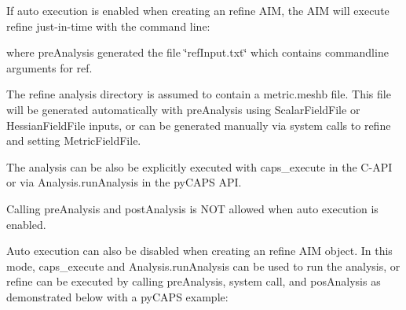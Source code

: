 If auto execution is enabled when creating an refine AIM, the AIM will execute refine just-\/in-\/time with the command line\+:


\begin{DoxyCode}{0}

\end{DoxyCode}


where pre\+Analysis generated the file \char`\"{}ref\+Input.\+txt\char`\"{} which contains commandline arguments for ref.

The refine analysis directory is assumed to contain a metric.\+meshb file. This file will be generated automatically with pre\+Analysis using Scalar\+Field\+File or Hessian\+Field\+File inputs, or can be generated manually via system calls to refine and setting Metric\+Field\+File.

The analysis can be also be explicitly executed with caps\+\_\+execute in the C-\/\+API or via Analysis.\+run\+Analysis in the py\+CAPS API.

Calling pre\+Analysis and post\+Analysis is NOT allowed when auto execution is enabled.

Auto execution can also be disabled when creating an refine AIM object. In this mode, caps\+\_\+execute and Analysis.\+run\+Analysis can be used to run the analysis, or refine can be executed by calling pre\+Analysis, system call, and pos\+Analysis as demonstrated below with a py\+CAPS example\+:


\begin{DoxyCode}{0}
\DoxyCodeLine{}
\DoxyCodeLine{}

\end{DoxyCode}
 